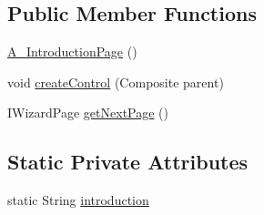 \subsection*{Public Member Functions}
\begin{DoxyCompactItemize}
\item 
\hyperlink{classit_1_1isislab_1_1masonassisteddocumentation_1_1mason_1_1wizards_1_1_a___introduction_page_afa9c82287e69bc1268264bba861a56d1}{A\-\_\-\-Introduction\-Page} ()
\item 
void \hyperlink{classit_1_1isislab_1_1masonassisteddocumentation_1_1mason_1_1wizards_1_1_a___introduction_page_a18a66da4d6393cfb232dd2d550eb2d9c}{create\-Control} (Composite parent)
\item 
I\-Wizard\-Page \hyperlink{classit_1_1isislab_1_1masonassisteddocumentation_1_1mason_1_1wizards_1_1_a___introduction_page_a1667a8d8ef50454c7a79c956f8f6fafb}{get\-Next\-Page} ()
\end{DoxyCompactItemize}
\subsection*{Static Private Attributes}
\begin{DoxyCompactItemize}
\item 
static String \hyperlink{classit_1_1isislab_1_1masonassisteddocumentation_1_1mason_1_1wizards_1_1_a___introduction_page_a2b1741f1921be08167b8d766305b1161}{introduction}
\end{DoxyCompactItemize}


